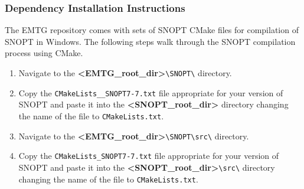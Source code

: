 
\subsubsection{Dependency Installation Instructions}
The EMTG repository comes with sets of SNOPT CMake files for compilation of SNOPT in Windows. The following steps walk through the SNOPT compilation process using CMake.
\begin{enumerate}
	
	\item Navigate to the \textbf{\textless EMTG\_root\_dir\textgreater}\verb|\SNOPT\| directory.
	\item Copy the \verb|CMakeLists__SNOPT7-7.txt| file appropriate for your version of SNOPT and paste it into the \textbf{\textless SNOPT\_root\_dir\textgreater} directory changing the name of the file to \verb|CMakeLists.txt|.
	
	\item Navigate to the \textbf{\textless EMTG\_root\_dir\textgreater}\verb|\SNOPT\src\| directory.
	\item Copy the \verb|CMakeLists_SNOPT7-7.txt| file appropriate for your version of SNOPT and paste it into the \textbf{\textless SNOPT\_root\_dir\textgreater}\verb|\src\| directory changing the name of the file to \verb|CMakeLists.txt|.


\end{enumerate}
